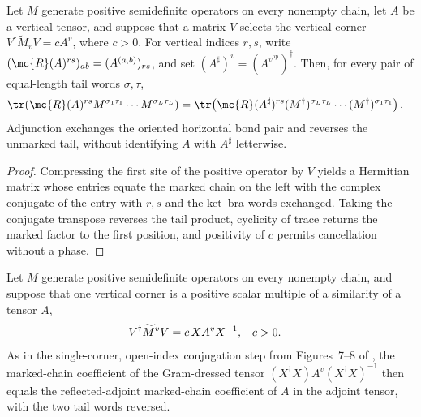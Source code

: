 \begin{lemma}
    \label{thm:mpdo_reflected_marked_chain}
    \leanok
    Let $M$ generate positive semidefinite operators on every nonempty chain,
    let $A$ be a vertical tensor, and suppose that a matrix $V$ selects the
    vertical corner $V^\dagger\widetilde M_vV=cA^v$, where $c>0$.
    For vertical indices $r,s$, write
    $(\mc{R}(A)^{rs})_{ab}=(A^{(a,b)})_{rs}$, and set
    $(A^\sharp)^v=(A^{v^{\mathrm{op}}})^\dagger$. Then, for every pair of
    equal-length tail words $\sigma,\tau$,
    \begin{align}
        \tr\!\left(\mc{R}(A)^{rs}
        M^{\sigma_1\tau_1}\cdots M^{\sigma_L\tau_L}\right)
         & =
        \tr\!\left(\mc{R}(A^\sharp)^{rs}
            (M^\dagger)^{\sigma_L\tau_L}\cdots
            (M^\dagger)^{\sigma_1\tau_1}\right).
        \label{eq:mpdo_reflected_chain}
    \end{align}
    Adjunction exchanges the oriented horizontal bond pair and reverses the
    unmarked tail, without identifying $A$ with $A^\sharp$ letterwise.
\end{lemma}

\begin{proof}
    \leanok
    Compressing the first site of the positive operator by $V$ yields a
    Hermitian matrix whose entries equate the marked chain on the left with
    the complex conjugate of the entry with $r,s$ and the ket--bra words
    exchanged. Taking the conjugate transpose reverses the tail product,
    cyclicity of trace returns the marked factor to the first position, and
    positivity of $c$ permits cancellation without a phase.
\end{proof}

\begin{lemma}
    \label{thm:mpdo_gram_dressed_reflected_marked_chain}
    \leanok
    Let $M$ generate positive semidefinite operators on every nonempty chain,
    and suppose that one vertical corner is a positive scalar multiple of a
    similarity of a tensor $A$,
    \begin{align}
        V^\dagger\widetilde M^vV & =c\,X A^vX^{-1},
                                 & c                & >0.
        \notag
    \end{align}
    As in the single-corner, open-index conjugation step from Figures~7--8 of
    \cite[Proposition~4.13, lines~1909--1919]{Cirac2016MPDO_arXiv}, the
    marked-chain coefficient of the Gram-dressed tensor
    $(X^\dagger X)A^v(X^\dagger X)^{-1}$ then equals the reflected-adjoint
    marked-chain coefficient of $A$ in the adjoint tensor, with the two tail
    words reversed.
\end{lemma}

